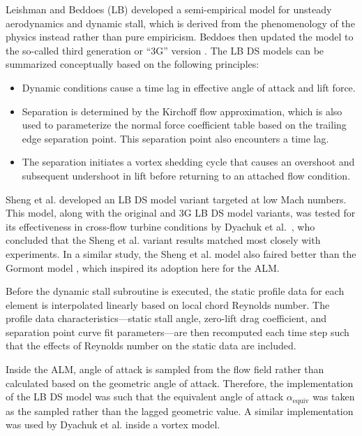 Leishman and Beddoes (LB) \cite{Leishman1989} developed a semi-empirical model
for unsteady aerodynamics and dynamic stall, which is derived from the
phenomenology of the physics instead rather than pure empiricism. Beddoes then
updated the model to the so-called third generation or ``3G'' version
\cite{Beddoes1993}. The LB DS models can be summarized conceptually based on the
following principles:
\begin{itemize}
    \item Dynamic conditions cause a time lag in effective angle of attack and
    lift force.

    \item Separation is determined by the Kirchoff flow approximation, which is
    also used to parameterize the normal force coefficient table based on the
    trailing edge separation point. This separation point also encounters a time
    lag.

    \item The separation initiates a vortex shedding cycle that causes an
    overshoot and subsequent undershoot in lift before returning to an attached
    flow condition.
\end{itemize}

Sheng et al. \cite{Sheng2008} developed an LB DS model variant targeted at low
Mach numbers. This model, along with the original and 3G LB DS model variants,
was tested for its effectiveness in cross-flow turbine conditions by Dyachuk et
al.~\cite{Dyachuk2014}, who concluded that the Sheng et al. variant results
matched most closely with experiments. In a similar study, the Sheng et al.
model also faired better than the Gormont model \cite{Dyachuk2015}, which
inspired its adoption here for the ALM.

Before the dynamic stall subroutine is executed, the static profile data for
each element is interpolated linearly based on local chord Reynolds number. The
profile data characteristics---static stall angle, zero-lift drag coefficient,
and separation point curve fit parameters---are then recomputed each time step
such that the effects of Reynolds number on the static data are included.

Inside the ALM, angle of attack is sampled from the flow field rather than
calculated based on the geometric angle of attack. Therefore, the implementation
of the LB DS model was such that the equivalent angle of attack
$\alpha_\mathrm{equiv}$ was taken as the sampled rather than the lagged
geometric value. A similar implementation was used by Dyachuk et al.
\cite{Dyachuk2015a} inside a vortex model.


